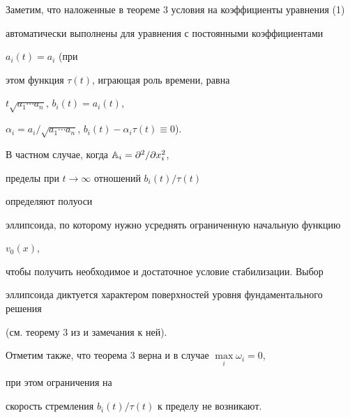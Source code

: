  


Заметим, что наложенные в теореме 3 условия на коэффициенты уравнения (1) 


автоматически выполнены для уравнения с постоянными коэффициентами 


$a_i(t)=a_i$ (при 


этом функция $\tau(t)$, играющая роль времени, равна 


$t\sqrt{a_1\dotsb a_n}$, $b_i(t)=a_i(t)$, 


$\alpha_i=a_i/\sqrt{a_1\dotsb a_n}$, $b_i(t)-\alpha_i\tau(t)\equiv 0$). 


 


В частном случае, когда $\Bbb A_i=\partial^2/\partial x^2_i$, 


пределы при $t\to\infty$ отношений $b_i(t)/\tau(t)$ 


определяют полуоси 


эллипсоида, по которому нужно усреднять ограниченную начальную функцию 


$v_0(x)$, 


чтобы получить необходимое и достаточное условие стабилизации. Выбор 


эллипсоида диктуется характером поверхностей уровня фундаментального решения 


(см. теорему 3 из \cite{Den} и замечания к ней). 


 


Отметим также, что теорема 3 верна и в случае $\max\limits_i\omega_i=0$, 


при этом ограничения на 


скорость стремления $b_i(t)/\tau(t)$ к пределу не возникают. 


 


